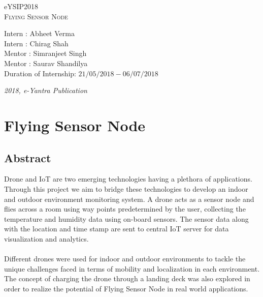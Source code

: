 \documentclass[a4paper,12pt,oneside]{book}
\begin{document}
\begin{titlepage}
\raggedright
{\Large eYSIP2018\\[1cm]}
{\Huge\scshape Flying Sensor Node \\[.1in]}
\vfill
\begin{flushright}
{\large \hspace{0.05cm} Intern : Abheet Verma \\}
{\large Intern \hspace{0.05cm} : Chirag Shah \\}
\hfill \linebreak
{\large Mentor : Simranjeet Singh \\}
{\large Mentor : Saurav Shandilya \\}
\hfill \linebreak
{\large Duration of Internship: $ 21/05/2018-06/07/2018 $ \\}
\end{flushright}

{\itshape 2018, e-Yantra Publication}
\end{titlepage}

\chapter[Project Tag]{Flying Sensor Node}
\section*{Abstract}

Drone and IoT are two emerging technologies having a plethora of applications. Through this project we aim to bridge these technologies to develop an indoor and outdoor environment monitoring system. A drone acts as a sensor node and flies across a room using way points predetermined by the user, collecting the temperature and humidity data using on-board sensors. The sensor data along with the location and time stamp are sent to central IoT server for data visualization and analytics.\\ \\ Different drones were used for indoor and outdoor environments to tackle the unique challenges faced in terms of mobility and localization in each environment. The concept of charging the drone through a landing deck was also explored in order to realize the potential of Flying Sensor Node in real world applications.
   
\end{document}
